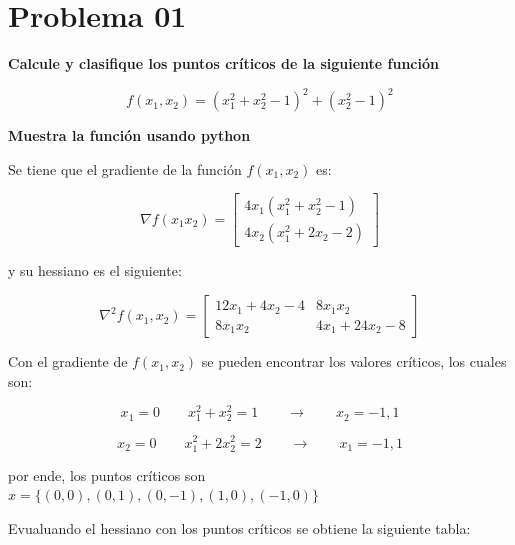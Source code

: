 \section*{Problema 01}

\textbf{Calcule y clasifique los puntos críticos de la siguiente función}

\begin{equation*}
    f(x_1,x_2) = (x_1^2+x_2^2-1)^2+(x_2^2-1)^2
\end{equation*}

\textbf{Muestra la función usando python}


Se tiene que el gradiente de la función $f(x_1,x_2)$ es:

\begin{equation*}
    \nabla f(x_1x_2) = \begin{bmatrix}
        4x_1 (x_1^2+x_2^2-1) \\
        4x_2 (x_1^2+2x_2-2)
    \end{bmatrix}
\end{equation*}

y su hessiano es el siguiente:

\begin{equation*}
    \nabla^2 f(x_1,x_2) = \begin{bmatrix}
        12x_1+4x_2 -4 & 8x_1x_2      \\
        8x_1x_2       & 4x_1+24x_2-8
    \end{bmatrix}
\end{equation*}

Con el gradiente de $f(x_1,x_2)$ se pueden encontrar los valores críticos, los cuales son:

\begin{equation*}
    x_1 = 0 \qquad x_1^2+x_2^2=1 \qquad \rightarrow\qquad x_2 = -1,1
\end{equation*}

\begin{equation*}
    x_2 = 0 \qquad x_1^2+2x_2^2=2 \qquad \rightarrow \qquad x_1 = -1,1
\end{equation*}

por ende, los puntos críticos son $x=\{(0,0),(0,1),(0,-1),(1,0),(-1,0)\}$

Evualuando el hessiano con los puntos críticos se obtiene la siguiente tabla:

